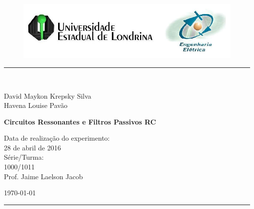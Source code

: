 \begin{titlepage}
\begin{center}
\begin{figure}[h]
\includegraphics[scale=0.76]{img/topdotitulo.png}
\end{figure}
\rule{\columnwidth}{1.5mm}
\

\large David Maykon Krepsky Silva	\\
\large Havena Louise Pavão 


\vspace{3.0cm}
{\bf \Large Circuitos Ressonantes e Filtros Passivos RC }
\vspace{3.0cm}

\begin{flushright}
Data de realização do experimento:\\
28 de abril de 2016\\
Série/Turma:\\
1000/1011\\
Prof. Jaime Laelson Jacob
\end{flushright}

\vspace{3.2cm}
\today

\rule{\columnwidth}{1.3mm}
\end{center}
\end{titlepage}